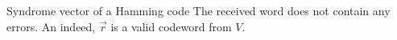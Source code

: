 \begin{refsection}
\begin{example}{Syndrome vector of a Hamming code}
	The received word does not contain any errors. An indeed, $\vec{r}$ is a valid codeword from $V$.
\end{example}


{}
\printbibliography[heading=subbibliography]
\end{refsection}

